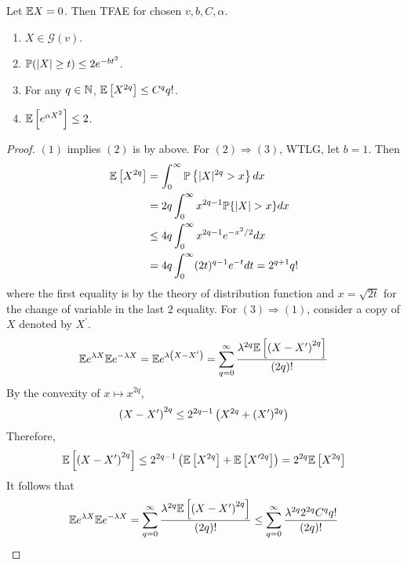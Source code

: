 \begin{enumerate}[label=\arabic{*}.]
	\begin{thm}
	    Let $\mathbb{E} X = 0$. Then TFAE for chosen $v,b,C,\alpha$.
	    \begin{enumerate}[label=(\arabic{*})]
	    	\item $X \in \mathcal{G}(v)$.
	    	\item $\mathbb{P}(\left\lvert X\right\lvert \geq t) \leq 2e^{-bt^2}$.
	    	\item For any $q \in \mathbb{N}$, $\mathbb{E} \left[X^{2q}\right] \leq C^q q!$.
	    	\item $\mathbb{E}\left[e^{\alpha X^2}\right] \leq 2$.
	    \end{enumerate}
	\end{thm}
	\begin{proof}
	    $(1)$ implies $(2)$ is by above. For $(2) \Rightarrow (3)$, WTLG, let $b=1$. Then
	    \begin{equation*}
	    	\begin{aligned}
				\E\left[X^{2 q}\right] & =\int_0^{\infty} \Pb\left\{|X|^{2 q}>x\right\} d x \\
				& =2 q \int_0^{\infty} x^{2 q-1} \Pb\{|X|>x\} d x \\
				&\leq 4 q \int_0^{\infty} x^{2 q-1} e^{-x^2 / 2} d x\\
				& = 4 q \int_0^{\infty}(2 t)^{q-1} e^{-t} d t=2^{q+1} q!
			\end{aligned}
	    \end{equation*}
	    where the first equality is by the theory of distribution function and $x = \sqrt{2t}$ for the change of variable in the last $2$ equality. For $(3) \Rightarrow (1)$, consider a copy of $X$ denoted by $X^\prime$.
	    \begin{equation*}
	    	\mathbb{E} e^{\lambda X} \mathbb{E} e^{-\lambda X}=\mathbb{E} e^{\lambda\left(X-X^{\prime}\right)}=\sum_{q=0}^{\infty} \frac{\lambda^{2 q} \mathbb{E}\left[\left(X-X^{\prime}\right)^{2 q}\right]}{(2 q)!}
	    \end{equation*}
	    By the convexity of $x \mapsto x^{2q}$,
	    \begin{equation*}
	    	\left(X-X^{\prime}\right)^{2 q} \leq 2^{2q-1}\left(X^{2q}+(X^\prime)^{2q}\right)
	    \end{equation*}
	    Therefore,
	    \begin{equation*}
	    	\mathbb{E}\left[\left(X-X^{\prime}\right)^{2 q}\right] \leq 2^{2 q-1}\left(\mathbb{E}\left[X^{2 q}\right]+\mathbb{E}\left[X^{\prime 2 q}\right]\right)=2^{2 q} \mathbb{E}\left[X^{2 q}\right]
	    \end{equation*}
	    It follows that
	    \begin{equation*}
	    	\E e^{\lambda X} \E e^{-\lambda X}=\sum_{q=0}^{\infty} \frac{\lambda^{2 q} \E\left[\left(X-X^{\prime}\right)^{2 q}\right]}{(2 q)!} \leq \sum_{q=0}^{\infty} \frac{\lambda^{2 q} 2^{2 q} C^q q!}{(2 q)!}

\end{equation*}
\end{proof}
\end{enumerate}
